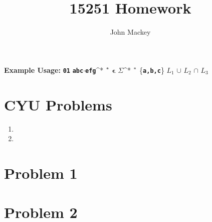 \documentclass[11pt,letterpaper]{article}
\title{15251 Homework \pset}
\author{John Mackey}%
\newcommand{\prob}[1]{\clearpage\section*{Problem #1}}
\newcommand{\str}[1]{\texttt{\textbf{#1}}}
\newcommand{\empStr}{{\ifmmode \mathbf{\epsilon} \else $\mathbf{\epsilon}$ \fi}}
\newcommand{\cat}{{\ifmmode \cdot \else $\cdot$\fi}}
\newcommand{\starOp}{{\ifmmode ^* \else $\vphantom{1}^*$ \fi}}
\newcommand{\albet}{{\ifmmode \Sigma \else $\Sigma$\fi}}
\newcommand{\alphlist}[1]{\{\str{#1}\}}
\newcommand{\union}{{\ifmmode \cup \else$\cup$ \fi}}
\newcommand{\intersect}{{{\ifmmode \cap \else$\cap$ \fi}}}
\begin{document}
\maketitle

\noindent \textbf{Example Usage:} \str{01} \str{abc}\cat\str{efg}\starOp \empStr \albet\starOp \alphlist{a,b,c} $L_1$ \union $L_2$ \intersect $L_3$


\section*{CYU Problems}
\begin{enumerate}
\item %
\item 
\end{enumerate}


\prob{1}
\prob{2}

\end{document}
